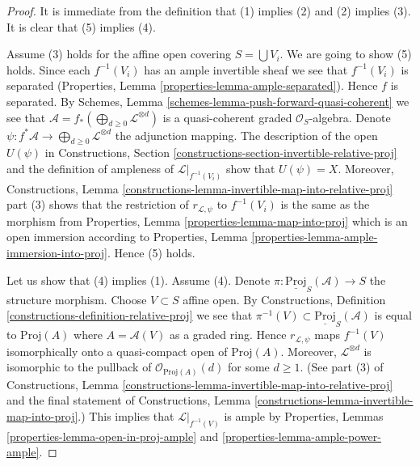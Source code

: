 \documentclass[10pt,a4paper]{amsart}
\theoremstyle{plain}
\theoremstyle{definition}
\theoremstyle{remark}
\numberwithin{equation}{subsection}
\begin{document}
\begin{proof}
It is immediate from the definition that (1) implies (2) and
(2) implies (3). It is clear that (5) implies (4).

\medskip\noindent
Assume (3) holds for the affine open covering $S = \bigcup V_i$.
We are going to show (5) holds.
Since each $f^{-1}(V_i)$ has an ample invertible sheaf we see
that $f^{-1}(V_i)$ is separated
(Properties, Lemma \ref{properties-lemma-ample-separated}).
Hence $f$ is separated. By
Schemes, Lemma \ref{schemes-lemma-push-forward-quasi-coherent}
we see that $\mathcal{A} = f_*(\bigoplus_{d \geq 0} \mathcal{L}^{\otimes d})$
is a quasi-coherent graded $\mathcal{O}_S$-algebra.
Denote $\psi : f^*\mathcal{A} \to \bigoplus_{d \geq 0} \mathcal{L}^{\otimes d}$
the adjunction mapping.
The description of the open $U(\psi)$ in
Constructions, Section
\ref{constructions-section-invertible-relative-proj}
and the definition of ampleness
of $\mathcal{L}|_{f^{-1}(V_i)}$ show that $U(\psi) = X$.
Moreover, Constructions,
Lemma \ref{constructions-lemma-invertible-map-into-relative-proj} part (3)
shows that the restriction of $r_{\mathcal{L}, \psi}$ to
$f^{-1}(V_i)$ is the same as the morphism from
Properties, Lemma \ref{properties-lemma-map-into-proj}
which is an open immersion according to
Properties, Lemma \ref{properties-lemma-ample-immersion-into-proj}.
Hence (5) holds.

\medskip\noindent
Let us show that (4) implies (1). Assume (4).
Denote $\pi : \underline{\text{Proj}}_S(\mathcal{A}) \to S$
the structure morphism. Choose $V \subset S$ affine open. By
Constructions, Definition \ref{constructions-definition-relative-proj}
we see that $\pi^{-1}(V) \subset \underline{\text{Proj}}_S(\mathcal{A})$
is equal to $\text{Proj}(A)$ where $A = \mathcal{A}(V)$
as a graded ring. Hence $r_{\mathcal{L}, \psi}$ maps
$f^{-1}(V)$ isomorphically onto
a quasi-compact open of $\text{Proj}(A)$.
Moreover, $\mathcal{L}^{\otimes d}$ is isomorphic to the pullback of
$\mathcal{O}_{\text{Proj}(A)}(d)$ for some $d \geq 1$.
(See part (3) of Constructions,
Lemma \ref{constructions-lemma-invertible-map-into-relative-proj}
and the final statement of Constructions,
Lemma \ref{constructions-lemma-invertible-map-into-proj}.)
This implies that $\mathcal{L}|_{f^{-1}(V)}$ is ample by
Properties, Lemmas \ref{properties-lemma-open-in-proj-ample}
and \ref{properties-lemma-ample-power-ample}.


\end{proof}
\end{document}
